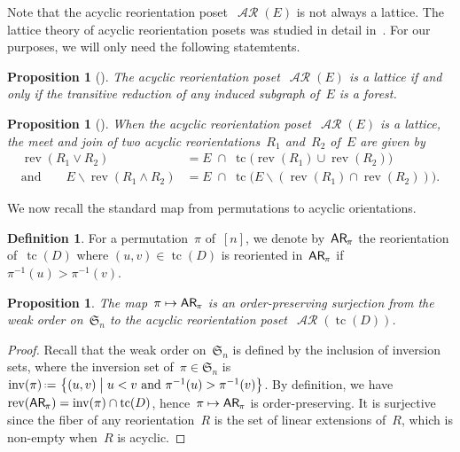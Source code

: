 \documentclass{amsart}
\newtheorem{proposition}[theorem]{Proposition}
\theoremstyle{definition}
\newtheorem{definition}[theorem]{Definition}
\renewcommand{\c}[1]{\mathcal{#1}} %
\newcommand{\set}[2]{\left\{ #1 \;\middle|\; #2 \right\}} %
\newcommand{\ssm}{\smallsetminus} %
\newcommand{\eqdef}{\mbox{\,\raisebox{0.2ex}{\scriptsize\ensuremath{\mathrm:}}\ensuremath{=}\,}} %
\DeclareMathOperator{\inv}{inv} %
\DeclareMathOperator{\tc}{tc} %
\newcommand{\fS}{\mathfrak{S}} %
\newcommand{\meet}{\wedge} %
\newcommand{\join}{\vee} %
\newcommand{\mymap}[2]{\mathsf{#1}_{\hspace{-.7pt}#2}}
\DeclareMathOperator{\AReori}{\c{AR}}  %
\newcommand{\areori}[1]{\mymap{AR}{#1}}  %
\DeclareMathOperator{\rev}{rev} %
\begin{document}
Note that the acyclic reorientation poset~$\AReori(E)$ is not always a lattice.
The lattice theory of acyclic reorientation posets was studied in detail in~\cite{Pilaud-acyclicReorientationLattices}.
For our purposes, we will only need the following statemtents.

\begin{proposition}[{\cite[Thm.~1]{Pilaud-acyclicReorientationLattices}}]
\label{prop:AReoriLat}
The acyclic reorientation poset~$\AReori(E)$ is a lattice if and only if the transitive reduction of any induced subgraph of~$E$ is a forest.
\end{proposition}

\begin{proposition}[{\cite[Thm.~9]{Pilaud-acyclicReorientationLattices}}]
\label{prop:AReoriLatJoinMeet}
When the acyclic reorientation poset~$\AReori(E)$ is a lattice, the meet and join of two acyclic reorientations~$R_1$ and~$R_2$ of~$E$ are given by
\begin{align*}
\rev(R_1 \join R_2) & = E \;\cap\; \tc \!\big( \rev(R_1) \cup \rev(R_2) \big) \\
\text{and}\qquad
E \ssm \rev(R_1 \meet R_2) & = E \;\cap\; \tc \!\big( E \ssm (\rev(R_1) \cap \rev(R_2)) \big).
\end{align*}
\end{proposition}

We now recall the standard map from permutations to acyclic orientations.

\begin{definition}
For a permutation~$\pi$ of~$[n]$, we denote by~$\areori{\pi}$ the reorientation of~$\tc(D)$ where $(u,v) \in \tc(D)$ is reoriented in~$\areori{\pi}$ if~$\pi^{-1}(u) > \pi^{-1}(v)$.
\end{definition}

\begin{proposition}
\label{prop:Perm2AReori}
The map~$\pi \mapsto \areori{\pi}$ is an order-preserving surjection from the weak order on~$\fS_n$ to the acyclic reorientation poset~$\AReori(\tc(D))$.
\end{proposition}

\begin{proof}
Recall that the weak order on~$\fS_n$ is defined by the inclusion of inversion sets, where the inversion set of~$\pi \in \fS_n$ is~$\inv(\pi) \eqdef \set{(u,v)}{u < v \text{ and } \pi^{-1}(u) > \pi^{-1}(v)}$.
By definition, we have~$\rev(\areori{\pi}) = \inv(\pi) \cap \tc(D)$, hence~$\pi \mapsto \areori{\pi}$ is order-preserving.
It is surjective since the fiber of any reorientation~$R$ is the set of linear extensions of~$R$, which is non-empty when~$R$ is acyclic.
\end{proof}
\end{document}
